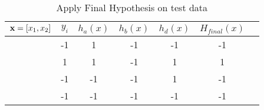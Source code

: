 \begin{table}[H]
  \centering
  \caption{Apply Final Hypothesis on test data}
  \label{tab:Ada1}
  \begin{tabular}{|c|c|c|c|c|c|c|}
    \hline
    ${\bf x} = [x_1,x_2]$ & $y_i$ & $h_a(x)$ & $h_b(x)$ & $h_d(x)$ & $H_{final}(x)$ \\ \hline
    [1,1]          &     -1  & 1    & -1   & -1                         &  -1     \\ \hline
    [1,-1]         &    1   & 1    & -1   & 1                          &    1   \\ \hline
    [-1,-1]        &     -1  & -1    & -1   & 1                           & -1      \\ \hline
    [-1,1]         &     -1 & -1    & -1   & -1                           &  -1     \\ \hline
  \end{tabular}
\end{table}
